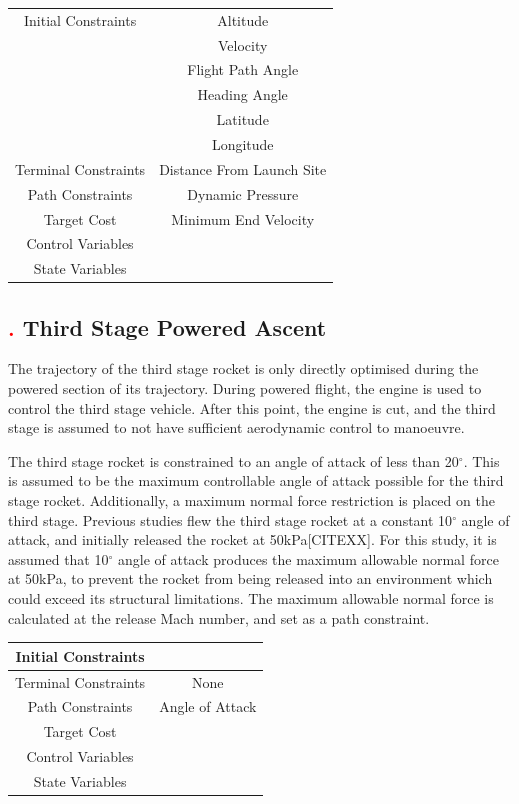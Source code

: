\begin{table}[H]
\begin{tabular}{|c|c|}
	\hline Initial Constraints  & Altitude \\ & Velocity\\ & Flight Path Angle\\ & Heading Angle\\ & Latitude\\ & Longitude\\ 
	\hline Terminal Constraints &  Distance From Launch Site \\ 
	\hline Path Constraints & Dynamic Pressure \\ 
	\hline Target Cost & Minimum End Velocity \\ 
				\hline Control Variables &  \\ 
				\hline State Variables &  \\ 
	\hline 
\end{tabular} 
\end{table}



\subsection{\textcolor{red}{.} Third Stage Powered Ascent}

The trajectory of the third stage rocket is only directly optimised during the powered section of its trajectory. During powered flight, the engine is used to control the third stage vehicle. After this point, the engine is cut, and the third stage is assumed to not have sufficient aerodynamic control to manoeuvre. 

The third stage rocket is constrained to an angle of attack of less than 20$^\circ$. This is assumed to be the maximum controllable angle of attack possible for the third stage rocket.   
Additionally, a maximum normal force restriction is placed on the third stage. Previous studies flew the third stage rocket at a constant 10$^\circ$ angle of attack, and initially released the rocket at 50kPa[CITEXX]. 
For this study, it is assumed that 10$^\circ$ angle of attack produces the maximum allowable normal force at 50kPa, to prevent the rocket from being released into an environment which could exceed its structural limitations. The maximum allowable normal force is calculated at the release Mach number, and set as a path constraint. 
\begin{table}[H]
\begin{tabular}{|c|c|}
	\hline Initial Constraints  & \\ 
	\hline Terminal Constraints & None \\ 
	\hline Path Constraints & Angle of Attack \\ 
	\hline Target Cost &  \\ 
				\hline Control Variables &  \\ 
				\hline State Variables &  \\ 
	\hline 
\end{tabular} 
\end{table}

